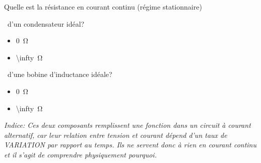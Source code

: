 \documentclass[canadien,12pt,oneside,letterpaper]{article}
\begin{document}
\begin{gradescope}
    \item Quelle est la résistance en courant continu (régime stationnaire)
        \begin{gradescope}
        \item $\,$ d'un condensateur idéal?
            \begin{itemize}[label=$\blacktriangleright$]
            \item \qty{0}{\ohm}
            \item \qty[parse-numbers = false]{\infty}{\ohm}
            \end{itemize}
        \item $\,$ d'une bobine d'inductance idéale?
            \begin{itemize}[label=$\blacktriangleright$]
            \item \qty{0}{\ohm}
            \item \qty[parse-numbers = false]{\infty}{\ohm}
            \end{itemize}
        \end{gradescope}
\end{gradescope}
\vspace{-1ex}
\textit{\footnotesize Indice: Ces deux composants remplissent une fonction dans un circuit à courant alternatif, car leur relation entre tension et courant dépend d'un taux de VARIATION par rapport au temps. Ils ne servent donc à rien en courant continu et il s'agit de comprendre physiquement pourquoi.}
\end{document}
